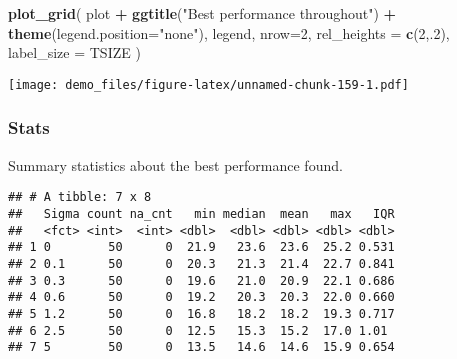 \documentclass[]{book}
\newenvironment{Shaded}{\begin{snugshade}}{\end{snugshade}}
\newcommand{\DataTypeTok}[1]{\textcolor[rgb]{0.13,0.29,0.53}{#1}}
\newcommand{\DecValTok}[1]{\textcolor[rgb]{0.00,0.00,0.81}{#1}}
\newcommand{\KeywordTok}[1]{\textcolor[rgb]{0.13,0.29,0.53}{\textbf{#1}}}
\newcommand{\NormalTok}[1]{#1}
\newcommand{\OperatorTok}[1]{\textcolor[rgb]{0.81,0.36,0.00}{\textbf{#1}}}
\newcommand{\OtherTok}[1]{\textcolor[rgb]{0.56,0.35,0.01}{#1}}
\newcommand{\StringTok}[1]{\textcolor[rgb]{0.31,0.60,0.02}{#1}}
\begin{document}
\begin{Shaded}
\begin{Highlighting}[]
\KeywordTok{plot_grid}\NormalTok{(}
\NormalTok{  plot }\OperatorTok{+}
\StringTok{    }\KeywordTok{ggtitle}\NormalTok{(}\StringTok{"Best performance throughout"}\NormalTok{) }\OperatorTok{+}
\StringTok{    }\KeywordTok{theme}\NormalTok{(}\DataTypeTok{legend.position=}\StringTok{"none"}\NormalTok{),}
\NormalTok{  legend,}
  \DataTypeTok{nrow=}\DecValTok{2}\NormalTok{,}
  \DataTypeTok{rel_heights =} \KeywordTok{c}\NormalTok{(}\DecValTok{2}\NormalTok{,.}\DecValTok{2}\NormalTok{),}
  \DataTypeTok{label_size =}\NormalTok{ TSIZE}
\NormalTok{)}
\end{Highlighting}
\end{Shaded}

\texttt{[image: demo\_files/figure-latex/unnamed-chunk-159-1.pdf]}

\hypertarget{stats-30}{%
\subsubsection{Stats}\label{stats-30}}

Summary statistics about the best performance found.

\begin{Shaded}
\end{Shaded}

\begin{verbatim}
## # A tibble: 7 x 8
##   Sigma count na_cnt   min median  mean   max   IQR
##   <fct> <int>  <int> <dbl>  <dbl> <dbl> <dbl> <dbl>
## 1 0        50      0  21.9   23.6  23.6  25.2 0.531
## 2 0.1      50      0  20.3   21.3  21.4  22.7 0.841
## 3 0.3      50      0  19.6   21.0  20.9  22.1 0.686
## 4 0.6      50      0  19.2   20.3  20.3  22.0 0.660
## 5 1.2      50      0  16.8   18.2  18.2  19.3 0.717
## 6 2.5      50      0  12.5   15.3  15.2  17.0 1.01 
## 7 5        50      0  13.5   14.6  14.6  15.9 0.654
\end{verbatim}
\end{document}
